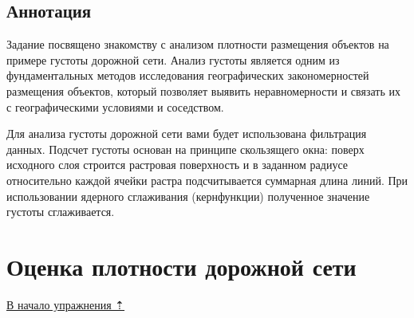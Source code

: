 \documentclass[]{book}
\theoremstyle{definition}
\theoremstyle{definition}
\theoremstyle{definition}
\theoremstyle{remark}
\begin{document}
\hypertarget{density-analysis-annotation}{%
\subsection{Аннотация}\label{density-analysis-annotation}}

Задание посвящено знакомству с анализом плотности размещения объектов на
примере густоты дорожной сети. Анализ густоты является одним из
фундаментальных методов исследования географических закономерностей
размещения объектов, который позволяет выявить неравномерности и связать
их с географическими условиями и соседством.

Для анализа густоты дорожной сети вами будет использована фильтрация
данных. Подсчет густоты основан на принципе скользящего окна: поверх
исходного слоя строится растровая поверхность и в заданном радиусе
относительно каждой ячейки растра подсчитывается суммарная длина линий.
При использовании ядерного сглаживания (кернфункции) полученное значение
густоты сглаживается.

\hypertarget{density-analysis-estimation}{%
\section{Оценка плотности дорожной
сети}\label{density-analysis-estimation}}

\protect\hyperlink{density-analysis}{В начало упражнения ⇡}
\end{document}
